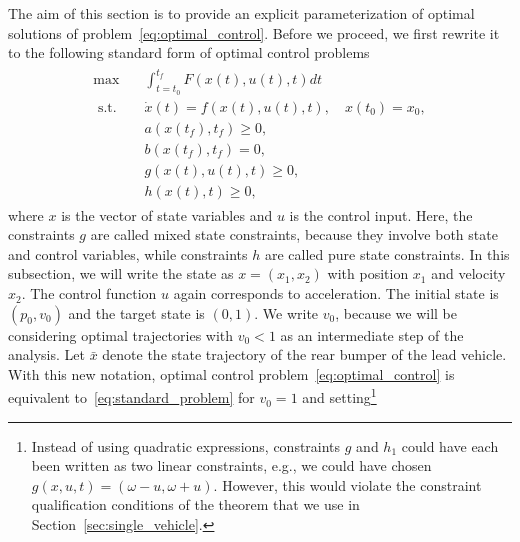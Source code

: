 \documentclass[a4paper]{article}
\theoremstyle{definition}
\theoremstyle{plain}
\begin{document}
The aim of this section is to provide an explicit parameterization of optimal
solutions of problem~\eqref{eq:optimal_control}.
%
Before we proceed, we first rewrite it to the following standard form of optimal
control problems
\begin{align}
  \label{eq:standard_problem}
  \begin{split}
  \max \quad & \int_{t=t_{0}}^{t_{f}} F(x(t), u(t), t) dt \\
  \text{ s.t. } \;\, & \dot{x}(t) = f(x(t), u(t), t) , \quad x(t_{0}) = x_{0} , \\
             & a(x(t_{f}), t_{f}) \geq 0 , \\
             & b(x(t_{f}), t_{f}) = 0 , \\
                & g(x(t), u(t), t) \geq 0 , \\
             & h(x(t), t) \geq 0 ,
  \end{split}
\end{align}
where $x$ is the vector of state variables and $u$ is the control input.
%
Here, the constraints $g$ are called mixed state constraints, because they
involve both state and control variables, while constraints $h$ are called pure
state constraints.
%
In this subsection, we will write the state as $x = (x_{1}, x_{2})$ with
position $x_{1}$ and velocity $x_{2}$. The control function $u$ again
corresponds to acceleration. The initial state is $(p_{0}, v_{0})$ and the
target state is $(0, 1)$. We write $v_{0}$, because we will be considering
optimal trajectories with $v_{0} < 1$ as an intermediate step of the analysis.
%
Let $\bar{x}$ denote the state trajectory of the rear bumper of the lead vehicle.
%
With this new notation, optimal control problem~\eqref{eq:optimal_control} is equivalent to~\eqref{eq:standard_problem} for
$v_{0} = 1$ and setting\footnote{Instead of using quadratic expressions, constraints $g$ and $h_{1}$ could have each been written as two linear constraints, e.g., we could have chosen $g(x, u, t) = (\omega - u, \omega + u)$. However, this would violate the constraint qualification conditions of the theorem that we use in Section~\ref{sec:single_vehicle}.}
\end{document}
